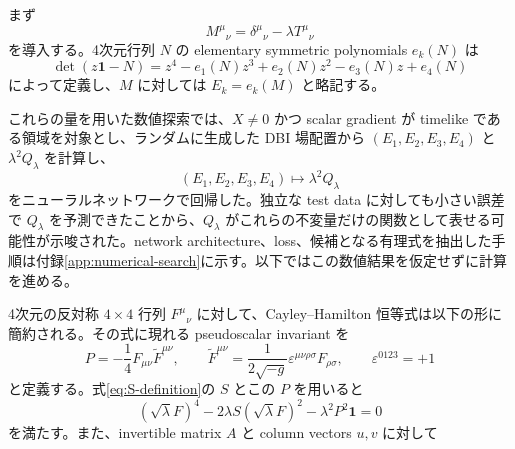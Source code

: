 \documentclass[a4paper,11pt]{ltjsarticle}
\numberwithin{equation}{section}
\newcommand{\Id}{\mathbf 1}
\newcommand{\eps}{\varepsilon}
\begin{document}
まず
\begin{equation}
 M^\mu{}_{\nu}=\delta^\mu{}_{\nu}-\lambda T^\mu{}_{\nu}
 \label{eq:M-definition}
\end{equation}
を導入する。4次元行列 $N$ の elementary symmetric polynomials $e_k(N)$ は
\begin{equation}
 \det(z\Id-N)
 =z^4-e_1(N)z^3+e_2(N)z^2-e_3(N)z+e_4(N)
 \label{eq:elementary-definition}
\end{equation}
によって定義し、$M$ に対しては $E_k=e_k(M)$ と略記する。

これらの量を用いた数値探索では、$X\neq0$ かつ scalar gradient が timelike である領域を対象とし、ランダムに生成した DBI 場配置から $(E_1,E_2,E_3,E_4)$ と $\lambda^2Q_\lambda$ を計算し、
\begin{equation}
 (E_1,E_2,E_3,E_4)\longmapsto \lambda^2Q_\lambda
 \label{eq:numerical-clue}
\end{equation}
をニューラルネットワークで回帰した。独立な test data に対しても小さい誤差で $Q_\lambda$ を予測できたことから、$Q_\lambda$ がこれらの不変量だけの関数として表せる可能性が示唆された。network architecture、loss、候補となる有理式を抽出した手順は付録\ref{app:numerical-search}に示す。以下ではこの数値結果を仮定せずに計算を進める。

4次元の反対称 $4\times4$ 行列 $F^\mu{}_{\nu}$ に対して、Cayley--Hamilton 恒等式は以下の形に簡約される。その式に現れる pseudoscalar invariant を
\begin{equation}
 P=-\frac14F_{\mu\nu}\widetilde F^{\mu\nu},
 \qquad
 \widetilde F^{\mu\nu}
 =\frac{1}{2\sqrt{-g}}\eps^{\mu\nu\rho\sigma}F_{\rho\sigma},
 \qquad \eps^{0123}=+1
 \label{eq:P-definition}
\end{equation}
と定義する。式\eqref{eq:S-definition}の $S$ とこの $P$ を用いると
\begin{equation}
 (\sqrt\lambda F)^4-2\lambda S(\sqrt\lambda F)^2-\lambda^2P^2\Id=0
 \label{eq:F-characteristic-main}
\end{equation}
を満たす。また、invertible matrix $A$ と column vectors $u,v$ に対して
\end{document}
